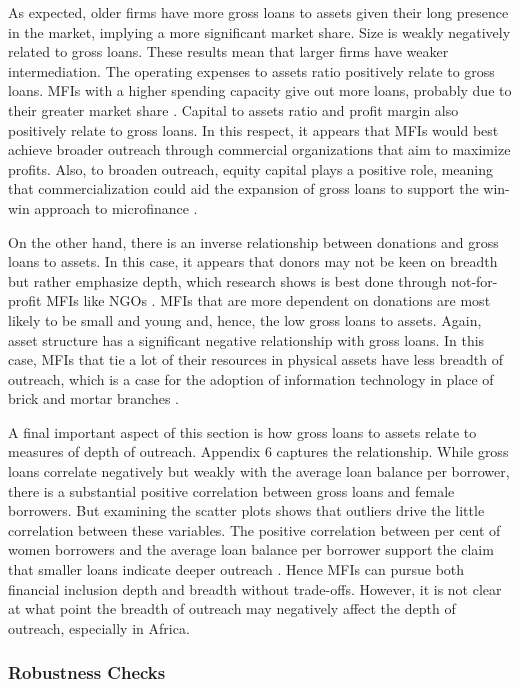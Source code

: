 \documentclass[a4paper, nobind]{templates/ociamthesis}
\begin{document}
As expected, older firms have more gross loans to assets given their long presence in the market, implying a more significant market share. Size is weakly negatively related to gross loans. These results mean that larger firms have weaker intermediation. The operating expenses to assets ratio positively relate to gross loans. MFIs with a higher spending capacity give out more loans, probably due to their greater market share \autocite{gutierrez2007microfinance}. Capital to assets ratio and profit margin also positively relate to gross loans. In this respect, it appears that MFIs would best achieve broader outreach through commercial organizations that aim to maximize profits. Also, to broaden outreach, equity capital plays a positive role, meaning that commercialization could aid the expansion of gross loans to support the win-win approach to microfinance \autocite{kodongo2013individual}.

On the other hand, there is an inverse relationship between donations and gross loans to assets. In this case, it appears that donors may not be keen on breadth but rather emphasize depth, which research shows is best done through not-for-profit MFIs like NGOs \autocite{d2017ngos,bos2015practice}. MFIs that are more dependent on donations are most likely to be small and young and, hence, the low gross loans to assets. Again, asset structure has a significant negative relationship with gross loans. In this case, MFIs that tie a lot of their resources in physical assets have less breadth of outreach, which is a case for the adoption of information technology in place of brick and mortar branches \autocite{d2017aid}.

A final important aspect of this section is how gross loans to assets relate to measures of depth of outreach. Appendix 6 captures the relationship. While gross loans correlate negatively but weakly with the average loan balance per borrower, there is a substantial positive correlation between gross loans and female borrowers. But examining the scatter plots shows that outliers drive the little correlation between these variables. The positive correlation between per cent of women borrowers and the average loan balance per borrower support the claim that smaller loans indicate deeper outreach \autocite{ayyagari2013financing}. Hence MFIs can pursue both financial inclusion depth and breadth without trade-offs. However, it is not clear at what point the breadth of outreach may negatively affect the depth of outreach, especially in Africa.

\hypertarget{robustness-checks}{%
\subsubsection{Robustness Checks}\label{robustness-checks}}
\end{document}
